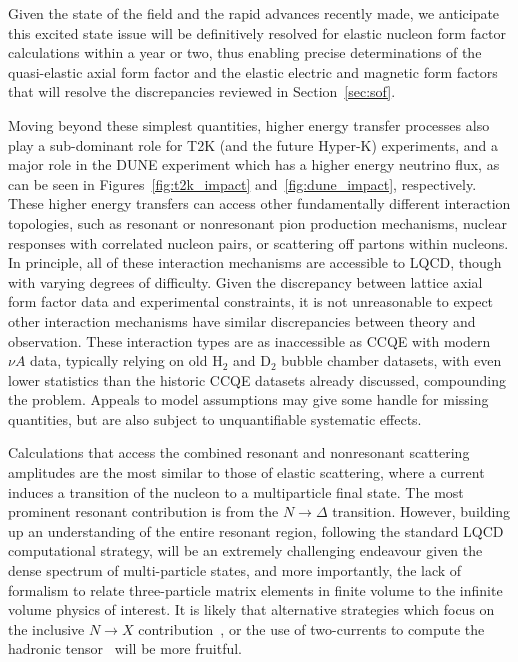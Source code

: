\documentclass{ar-1col}
\def\D{\Delta}
\begin{document}
Given the state of the field and the rapid advances recently made, we anticipate this excited state issue will be definitively resolved for elastic nucleon form factor calculations within a year or two, thus enabling precise determinations of the quasi-elastic axial form factor and the elastic electric and magnetic form factors that will resolve the discrepancies reviewed in Section~\ref{sec:sof}.


Moving beyond these simplest quantities, higher energy transfer processes also play a sub-dominant role for T2K (and the future
Hyper-K) experiments, and a major role in the DUNE experiment which has a higher energy neutrino
flux, as can be seen in Figures~\ref{fig:t2k_impact} and~\ref{fig:dune_impact}, respectively.
These higher energy transfers can access other fundamentally different interaction topologies,
 such as resonant or nonresonant pion production mechanisms,
 nuclear responses with correlated nucleon pairs,
 or scattering off partons within nucleons.
In principle, all of these interaction mechanisms are accessible to LQCD,
 though with varying degrees of difficulty.
Given the discrepancy between lattice axial form factor data and experimental constraints,
 it is not unreasonable to expect other interaction mechanisms have similar discrepancies
 between theory and observation.
These interaction types are as inaccessible as CCQE with modern $\nu A$ data, typically relying on old H$_2$ and D$_2$ bubble chamber datasets, with even lower statistics than the historic CCQE datasets already discussed, compounding the problem.
Appeals to model assumptions may give some handle for missing quantities,
 but are also subject to unquantifiable systematic effects.

Calculations that access the combined resonant and nonresonant scattering amplitudes
 are the most similar to those of elastic scattering,
 where a current induces a transition of the nucleon to a multiparticle final state.
The most prominent resonant contribution is from the $N\rightarrow\D$ transition.
However, building up an understanding of the entire resonant region, following the standard LQCD computational strategy, will be an extremely challenging endeavour given the dense spectrum of multi-particle states, and more importantly, the lack of formalism to relate three-particle matrix elements in finite volume to the infinite volume physics of interest.
It is likely that alternative strategies which focus on the inclusive $N\rightarrow X$ contribution~\cite{Hansen:2017mnd,Gambino:2020crt,Fukaya:2020wpp,Bruno:2020kyl}, or the use of two-currents to compute the hadronic tensor~\cite{Liu:1993cv,Liang:2019frk} will be more fruitful.
\end{document}
